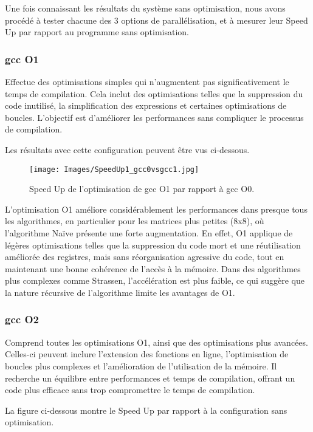 \documentclass[../CSC_5RO06_TA.tex]{subfiles}
\begin{document}
Une fois connaissant les résultats du système sans optimisation, nous avons procédé à tester chacune des 3 options de parallélisation, et à mesurer leur Speed Up par rapport au programme sans optimisation.

\subsubsection{gcc O1}

Effectue des optimisations simples qui n'augmentent pas significativement le temps de compilation. Cela inclut des optimisations telles que la suppression du code inutilisé, la simplification des expressions et certaines optimisations de boucles. L'objectif est d'améliorer les performances sans compliquer le processus de compilation.

Les résultats avec cette configuration peuvent être vus ci-dessous.

\begin{figure}[H]
    \centering
    \texttt{[image: Images/SpeedUp1\_gcc0vsgcc1.jpg]}
    \caption{Speed Up de l'optimisation de gcc O1 par rapport à gcc O0.}
    \label{fig:2}
\end{figure}

L'optimisation O1 améliore considérablement les performances dans presque tous les algorithmes, en particulier pour les matrices plus petites (8x8), où l'algorithme Naïve présente une forte augmentation. En effet, O1 applique de légères optimisations telles que la suppression du code mort et une réutilisation améliorée des registres, mais sans réorganisation agressive du code, tout en maintenant une bonne cohérence de l'accès à la mémoire. Dans des algorithmes plus complexes comme Strassen, l’accélération est plus faible, ce qui suggère que la nature récursive de l’algorithme limite les avantages de O1.

\subsubsection{gcc O2}

Comprend toutes les optimisations O1, ainsi que des optimisations plus avancées. Celles-ci peuvent inclure l’extension des fonctions en ligne, l’optimisation de boucles plus complexes et l’amélioration de l’utilisation de la mémoire. Il recherche un équilibre entre performances et temps de compilation, offrant un code plus efficace sans trop compromettre le temps de compilation.

La figure ci-dessous montre le Speed Up par rapport à la configuration sans optimisation.
\end{document}
